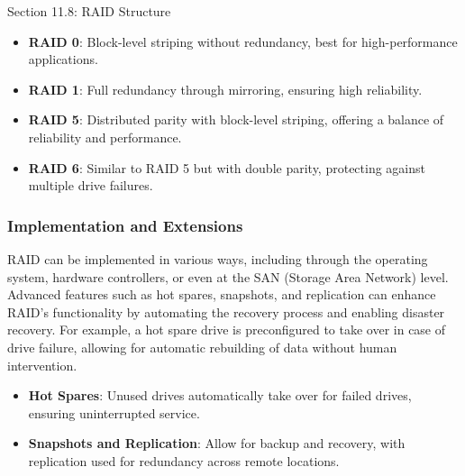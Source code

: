 \begin{notes}{Section 11.8: RAID Structure}
    \begin{highlight}
    
        \begin{itemize}
            \item \textbf{RAID 0}: Block-level striping without redundancy, best for high-performance applications.
            \item \textbf{RAID 1}: Full redundancy through mirroring, ensuring high reliability.
            \item \textbf{RAID 5}: Distributed parity with block-level striping, offering a balance of reliability and performance.
            \item \textbf{RAID 6}: Similar to RAID 5 but with double parity, protecting against multiple drive failures.
        \end{itemize}
    
    \end{highlight}
    
    \subsubsection*{Implementation and Extensions}
    
    RAID can be implemented in various ways, including through the operating system, hardware controllers, or even at the SAN (Storage Area Network) level. Advanced features such as hot spares, 
    snapshots, and replication can enhance RAID's functionality by automating the recovery process and enabling disaster recovery. For example, a hot spare drive is preconfigured to take over in case 
    of drive failure, allowing for automatic rebuilding of data without human intervention.

    \begin{highlight}
    
        \begin{itemize}
            \item \textbf{Hot Spares}: Unused drives automatically take over for failed drives, ensuring uninterrupted service.
            \item \textbf{Snapshots and Replication}: Allow for backup and recovery, with replication used for redundancy across remote locations.
        \end{itemize}
    
    \end{highlight}
    
    \begin{highlight}
    

\end{highlight}
\end{notes}
